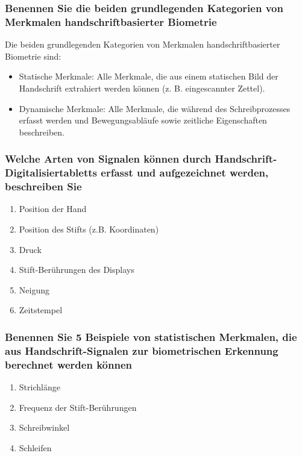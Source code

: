 \documentclass{article}
\begin{document}
\subsubsection{Benennen Sie die beiden grundlegenden Kategorien von Merkmalen handschriftbasierter Biometrie}

Die beiden grundlegenden Kategorien von Merkmalen handschriftbasierter Biometrie sind:

\begin{itemize}
	\item Statische Merkmale: Alle Merkmale, die aus einem statischen Bild der Handschrift extrahiert werden können (z. B. eingescannter Zettel).
	\item Dynamische Merkmale: Alle Merkmale, die während des Schreibprozesses erfasst werden und Bewegungsabläufe sowie zeitliche Eigenschaften beschreiben.
\end{itemize}

\subsubsection{Welche Arten von Signalen können durch Handschrift-Digitalisiertabletts erfasst und aufgezeichnet werden, beschreiben Sie}

\begin{enumerate}
	\item Position der Hand
	\item Position des Stifts (z.B. Koordinaten)
	\item Druck
	\item Stift-Berührungen des Displays
	\item Neigung
	\item Zeitstempel
\end{enumerate}

\subsubsection{Benennen Sie 5 Beispiele von statistischen Merkmalen, die aus Handschrift-Signalen zur biometrischen Erkennung berechnet werden können}

\begin{enumerate}
	\item Strichlänge
	\item Frequenz der Stift-Berührungen
	\item Schreibwinkel
	\item Schleifen
\end{enumerate}
\end{document}

